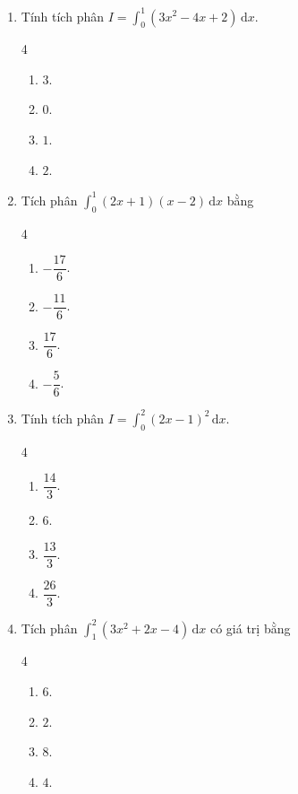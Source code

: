 \documentclass[12pt]{article}
\begin{document}
\begin{enumerate}[label=\textbf{Câu \arabic*.}]
		\item Tính tích phân $I = \displaystyle \int_0^1 (3x^2 - 4x + 2)\,\mathrm{d}x$.
		\begin{multicols}{4}
			\begin{enumerate}[label=\textbf{\Alph*.}]
				\item $3$.
				\item $0$.
				\item $1$.
				\item $2$.
			\end{enumerate}
		\end{multicols}
		
		\item Tích phân $\displaystyle \int_0^1 (2x + 1)(x - 2)\,\mathrm{d}x$ bằng
		\begin{multicols}{4}
			\begin{enumerate}[label=\textbf{\Alph*.}]
				\item $-\dfrac{17}{6}$.
				\item $-\dfrac{11}{6}$.
				\item $\dfrac{17}{6}$.
				\item $-\dfrac{5}{6}$.
			\end{enumerate}
		\end{multicols}
		
		\item Tính tích phân $I = \displaystyle \int_0^2 (2x - 1)^2\,\mathrm{d}x$.
		\begin{multicols}{4}
			\begin{enumerate}[label=\textbf{\Alph*.}]
				\item $\dfrac{14}{3}$.
				\item $6$.
				\item $\dfrac{13}{3}$.
				\item $\dfrac{26}{3}$.
			\end{enumerate}
		\end{multicols}
		
		\item Tích phân $\displaystyle \int_1^2 (3x^2 + 2x - 4)\,\mathrm{d}x$ có giá trị bằng
		\begin{multicols}{4}
			\begin{enumerate}[label=\textbf{\Alph*.}]
				\item $6$.
				\item $2$.
				\item $8$.
				\item $4$.
			\end{enumerate}
		\end{multicols}
		

\end{enumerate}
\end{document}
